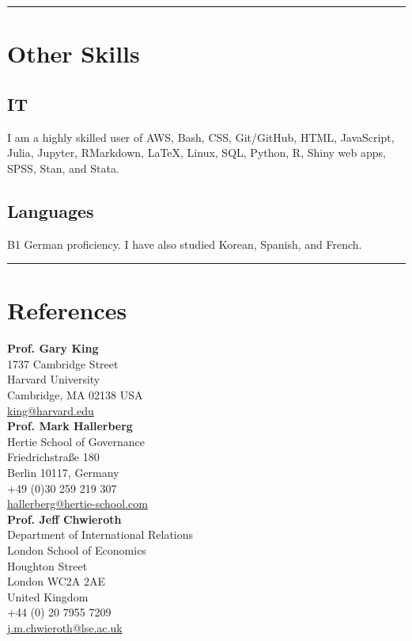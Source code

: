 \documentclass[a4paper]{article}
\begin{document}
\vspace{0.5cm}
\medskip\hrule height 1pt
\vspace{0.5cm}

\section*{Other Skills}

\subsection*{IT}

I am a highly skilled user of AWS, Bash, CSS, Git/GitHub, HTML, JavaScript, Julia, Jupyter, RMarkdown, LaTeX, Linux, SQL, Python, R, Shiny web apps, SPSS, Stan, and Stata.

\subsection*{Languages}

B1 German proficiency. I have also studied Korean, Spanish, and French.


\vspace{0.5cm}
\medskip\hrule height 1pt
\vspace{0.5cm}

\section*{References}

\noindent \textbf{Prof. Gary King} \\
1737 Cambridge Street \\
Harvard University \\
Cambridge, MA 02138
USA \\
\href{mailto:king@harvard.edu}{king@harvard.edu}\\

\noindent \textbf{Prof. Mark Hallerberg} \\
Hertie School of Governance\\
Friedrichstra{\ss}e 180\\
Berlin 10117, Germany \\
+49 (0)30 259 219 307 \\
\href{mailto:hallerberg@hertie-school.com}{hallerberg@hertie-school.com}\\

\noindent \textbf{Prof. Jeff Chwieroth}\\
Department of International Relations \\
London School of Economics \\
Houghton Street \\
London WC2A 2AE \\
United Kingdom\\
+44 (0) 20 7955 7209\\
\href{mailto:j.m.chwieroth@lse.ac.uk}{j.m.chwieroth@lse.ac.uk}\\
\end{document}
